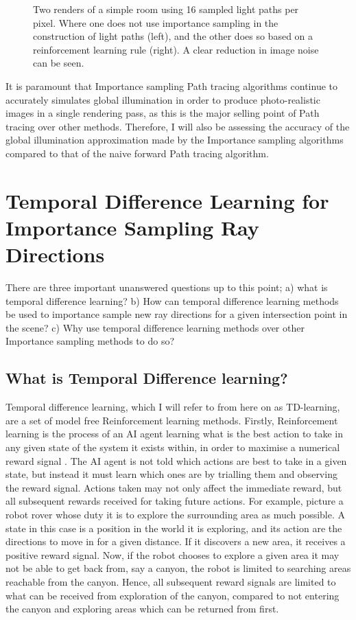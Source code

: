 \documentclass[../dissertation.tex]{subfiles}
\begin{document}
\begin{figure}[h]
\begin{minipage}{.45\textwidth}
\end{minipage}
\caption{Two renders of a simple room using 16 sampled light paths per pixel. Where one does not use importance sampling in the construction of light paths (left), and the other does so based on a reinforcement learning rule (right). A clear reduction in image noise can be seen.}
\label{fig:noise_reduction_simple_room}
\end{figure}

It is paramount that Importance sampling Path tracing algorithms continue to accurately
simulates global illumination in order to produce photo-realistic images in a single
rendering pass, as this is the major selling point of Path tracing over other 
methods. Therefore, I will also be assessing the accuracy of the global
illumination approximation made by the Importance sampling algorithms compared
to that of the naive forward Path tracing algorithm.

\section{Temporal Difference Learning for Importance Sampling Ray Directions}
\label{sec:td_learn_for_importance}

There are three important unanswered questions up to this point; a) what is temporal
difference learning?  b) How can temporal difference learning methods be 
used to importance sample new ray directions for a given intersection point in 
the scene? c) Why use temporal difference learning methods over other Importance 
sampling methods to do so? 

\subsection{What is Temporal Difference learning?}
Temporal difference learning, which I will refer to from 
here on as TD-learning, are a set of model free Reinforcement learning methods. 
Firstly, Reinforcement learning is the process of an AI agent learning what is the 
best action to take in any given state of the system it exists within, in order to 
maximise a numerical reward signal \cite{sutton2011reinforcement}.
The AI agent is not told which actions are  best to take in a given state, but
 instead it must learn which ones are by trialling them and observing the reward 
signal. Actions taken may not only affect the immediate 
reward, but all subsequent rewards received for taking future actions. For 
example, picture a robot rover whose duty it is to explore the surrounding area 
as much possible. A state in this case is a position in the world it is exploring, 
and its action are the directions to move in for a given distance. If it discovers 
a new area, it receives a positive reward signal. Now, if the robot chooses to 
explore a given area it may not be able to get back from, say a canyon, the 
robot is limited to searching areas reachable from the canyon. Hence, all 
subsequent reward signals are limited to what can be received from exploration 
of the canyon, compared to not entering the canyon and exploring areas which 
can be returned from first.
\end{document}
